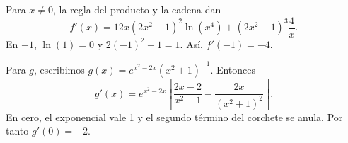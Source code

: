 Para $x\ne0$, la regla del producto y la cadena dan
\[
f'(x)=12x(2x^2-1)^2\ln(x^4)+(2x^2-1)^3\frac4x.
\]
En $-1$, $\ln(1)=0$ y $2(-1)^2-1=1$. Así, $\boxed{f'(-1)=-4}$.

Para $g$, escribimos $g(x)=e^{x^2-2x}(x^2+1)^{-1}$.
Entonces
\[
g'(x)=e^{x^2-2x}
\left[\frac{2x-2}{x^2+1}-\frac{2x}{(x^2+1)^2}\right].
\]
En cero, el exponencial vale 1 y el segundo término del
corchete se anula. Por tanto $\boxed{g'(0)=-2}$.
